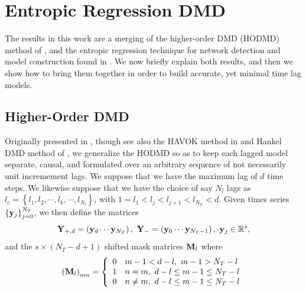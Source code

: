 \documentclass[a4paper,11pt]{article}
\newcommand{\ba}{\begin{array}}
\newcommand{\ea}{\end{array}}
\begin{document}
\section{Entropic Regression DMD}

The results in this work are a merging of the higher-order DMD (HODMD) method of \cite{clainche}, and the entropic regression technique for network detection and model construction found in \cite{bollt, bollt2}.  We now briefly explain both results, and then we show how to bring them together in order to build accurate, yet minimal time lag models.     

\subsection{Higher-Order DMD}

Originally presented in \cite{clainche}, though see also the HAVOK method in \cite{brunton_havok} and Hankel DMD method of \cite{arbabi}, we generalize the HODMD so as to keep each lagged model separate, causal, and formulated over an arbitrary sequence of not necessarily unit incremement lags.  We suppose that we have the maximum lag of $d$ time steps.  We likewise suppose that we have the choice of say $N_{l}$ lags as $l_{c}=\left\{l_{1}, l_{2}, \cdots, l_{k}, \cdots, l_{N_{l}}\right\}$, with $1=l_{1} < l_{j} < l_{j+1} < l_{N_{L}}<d$.  Given times series $\left\{{\bf y}_{j}\right\}_{j=0}^{N_{T}}$, we then define the matrices 
\[
{\bf Y}_{+,d} = \left({\bf y}_{d} \cdots {\bf y}_{N_{T}}\right), ~ {\bf Y}_{-} = \left({\bf y}_{0} \cdots {\bf y}_{N_{T}-1}\right), ~ {\bf y}_{j}\in\mathbb{R}^{s},
\]  
and the $s\times (N_{T}-d+1)$ shifted mask matrices ${\bf M}_{l}$ where
\[
\left({\bf M}_{l}\right)_{mn} = \left\{
\ba{rl}
0 & m-1 < d-l, ~ m-1 > N_{T} - l\\
1 & n=m, ~ d-l\leq m-1 \leq N_{T} - l\\
0 & n\neq m, ~ d-l\leq m-1 \leq N_{T} - l
\ea
\right.
\]
\end{document}

